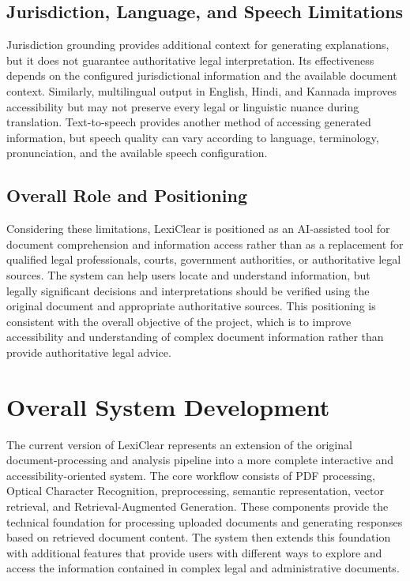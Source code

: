 \documentclass[12pt,a4paper,oneside]{report}
\begin{document}
\subsection{Jurisdiction, Language, and Speech Limitations}

Jurisdiction grounding provides additional context for generating
explanations, but it does not guarantee authoritative legal interpretation.
Its effectiveness depends on the configured jurisdictional information and
the available document context. Similarly, multilingual output in English,
Hindi, and Kannada improves accessibility but may not preserve every legal
or linguistic nuance during translation. Text-to-speech provides another
method of accessing generated information, but speech quality can vary
according to language, terminology, pronunciation, and the available speech
configuration.

\subsection{Overall Role and Positioning}

Considering these limitations, LexiClear is positioned as an AI-assisted
tool for document comprehension and information access rather than as a
replacement for qualified legal professionals, courts, government
authorities, or authoritative legal sources. The system can help users
locate and understand information, but legally significant decisions and
interpretations should be verified using the original document and
appropriate authoritative sources. This positioning is consistent with the
overall objective of the project, which is to improve accessibility and
understanding of complex document information rather than provide
authoritative legal advice.

\section{Overall System Development}

The current version of LexiClear represents an extension of the original
document-processing and analysis pipeline into a more complete interactive
and accessibility-oriented system. The core workflow consists of PDF
processing, Optical Character Recognition, preprocessing, semantic
representation, vector retrieval, and Retrieval-Augmented Generation. These
components provide the technical foundation for processing uploaded documents
and generating responses based on retrieved document content. The system
then extends this foundation with additional features that provide users with
different ways to explore and access the information contained in complex
legal and administrative documents.
\end{document}
